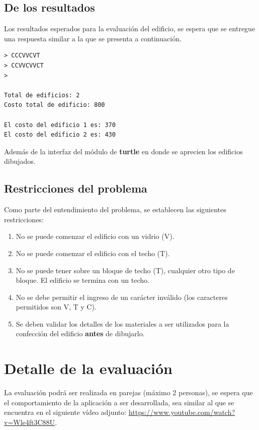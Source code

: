 \documentclass[]{article}
\begin{document}
    \subsection{De los resultados}
    Los resultados esperados para la evaluación del edificio, se espera que se entregue una respuesta similar a la que se presenta a continuación.\\

    \begin{verbatim}
> CCCVVCVT
> CCVVCVVCT
>

Total de edificios: 2
Costo total de edificio: 800

El costo del edificio 1 es: 370
El costo del edificio 2 es: 430
    \end{verbatim}

    Además de la interfaz del módulo de \textbf{turtle} en donde se aprecien los edificios dibujados.

    \subsection{Restricciones del problema}
    Como parte del entendimiento del problema, se establecen las siguientes restricciones:

    \begin{enumerate}
        \item No se puede comenzar el edificio con un vidrio (V).
        \item No se puede comenzar el edificio con el techo (T).
        \item No se puede tener sobre un bloque de techo (T), cualquier otro tipo de bloque. El edificio se termina con un techo.
        \item No se debe permitir el ingreso de un carácter inválido (los caracteres permitidos son V, T y C).
        \item Se deben validar los detalles de los materiales a ser utilizados para la confección del edificio \textbf{antes} de dibujarlo.
    \end{enumerate}

    \section{Detalle de la evaluación}
    La evaluación podrá ser realizada en parejas (máximo 2 personas), se espera que el comportamiento de la aplicación a ser desarrollada, sea similar al que se encuentra en el siguiente vídeo adjunto: \href{https://www.youtube.com/watch?v=Wle4ft3C88U}{https://www.youtube.com/watch?v=Wle4ft3C88U}.
    
\end{document}
